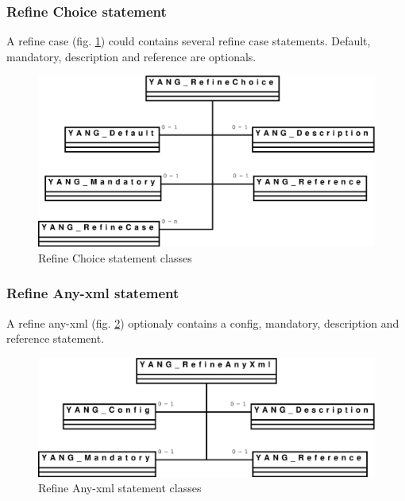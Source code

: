 \documentclass[a4paper]{article}
\begin{document}
\subsubsection{Refine Choice statement}

A refine case (fig.  \ref{refinechoice}) could contains several refine
case  statements. Default,  mandatory, description  and  reference are
optionals.
\begin{figure}[htbp]
\begin{center}
\includegraphics[scale = .3]{refinechoice.eps}
\end{center}
\caption{Refine Choice statement classes}
\label{refinechoice}
\end{figure}

\subsubsection{Refine Any-xml statement}

A refine any-xml (fig. \ref{refineanyxml}) optionaly contains a config,
mandatory, description and reference statement.
\begin{figure}[htbp]
\begin{center}
\includegraphics[scale = .3]{refineanyxml.eps}
\end{center}
\caption{Refine Any-xml statement classes}
\label{refineanyxml}
\end{figure}
\end{document}

